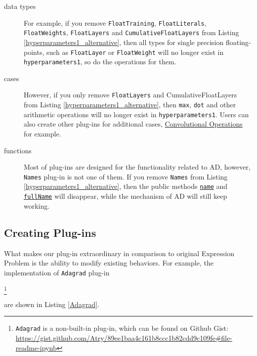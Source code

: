 \begin{description}
  
  \item[data types] For example, if you remove \lstinline{FloatTraining}, \lstinline{FloatLiterals},  \lstinline{FloatWeights}, \lstinline{FloatLayers} and \lstinline{CumulativeFloatLayers} from Listing \ref{hyperparameters1_alternative}, then all types for single precision floating-points, such as  \lstinline{FloatLayer} or \lstinline{FloatWeight} will no longer exist in \lstinline{hyperparameters1}, so do the operations for them.

  \item[cases] However, if you only remove \lstinline{FloatLayers} and {CumulativeFloatLayers} from Listing \ref{hyperparameters1_alternative}, then \lstinline{max}, \lstinline{dot} and other arithmetic operations will no longer exist in \lstinline{hyperparameters1}. Users can also create other \glspl{plug-in} for additional cases, \href{https://gist.github.com/Atry/15b7d9a4c63d95ad3d67e94bf20b4f69#file-readme-ipynb}{Convolutional Operations} for example.
  
  \item[functions] Most of \glspl{plug-in} are designed for the functionality related to AD, however, \lstinline{Names} \gls{plug-in} is not one of them. If you remove \lstinline{Names} from Listing \ref{hyperparameters1_alternative}, then the public methods \href{https://javadoc.io/page/com.thoughtworks.deeplearning/deeplearning_2.11/latest/com/thoughtworks/deeplearning/plugins/Names%24Layer.html#name:sourcecode.Name}{\lstinline{name}} and \href{https://javadoc.io/page/com.thoughtworks.deeplearning/deeplearning_2.11/latest/com/thoughtworks/deeplearning/plugins/Names%24Layer.html#fullName:sourcecode.FullName}{\lstinline{fullName}} will disappear, while the mechanism of AD will still keep working.

\end{description}


\subsection{Creating Plug-ins}

What makes our \gls{plug-in} extraordinary in comparison to original Expression Problem is the ability to modify existing behaviors. For example, the implementation of \lstinline{Adagrad} \gls{plug-in}
\begin{anonsuppress}
  \footnote{\lstinline{Adagrad} is a non-built-in \gls{plug-in}, which can be found on Github Gist: \url{https://gist.github.com/Atry/89ee1baa4c161b8ccc1b82cdd9c109fe#file-readme-ipynb}}
\end{anonsuppress}
are shown in Listing \ref{Adagrad}.

